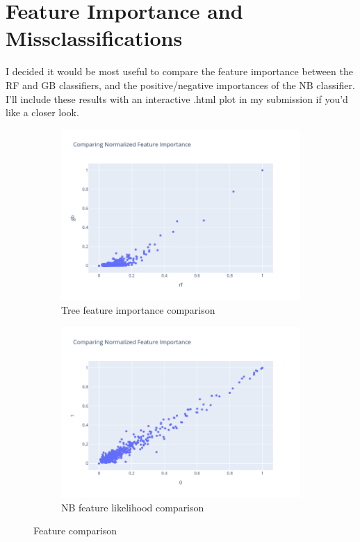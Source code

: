 \documentclass[12pt]{article}
\begin{document}
\section{Feature Importance and Missclassifications}

I decided it would be most useful to compare the feature importance between the RF and GB classifiers, and the 
positive/negative importances of the NB classifier. I'll include these results with an interactive .html plot in my 
submission if you'd like a closer look. 

\begin{figure}
  \begin{subfigure}{.5\textwidth}
  \includegraphics[width=.95\textwidth]{../results/tree_comparison.png}
    \caption{Tree feature importance comparison}
    \end{subfigure}%
  \begin{subfigure}{.5\textwidth}
    \includegraphics[width=.95\textwidth]{../results/nb_comparison.png}
    \caption{NB feature likelihood comparison}
  \end{subfigure}
  \caption{Feature comparison}
  \label{figure5}
\end{figure}
\end{document}
